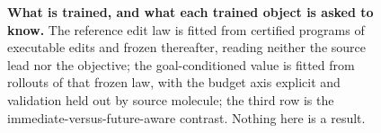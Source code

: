 \begin{figure}[h]
\centering
{}
\caption{\small\textbf{What is trained, and what each trained object is asked to know.} The reference edit law is fitted from certified programs of executable edits and frozen thereafter, reading neither the source lead nor the objective; the goal-conditioned value is fitted from rollouts of that frozen law, with the budget axis explicit and validation held out by source molecule; the third row is the immediate-versus-future-aware contrast. Nothing here is a result.}
\label{fig:trained}
\end{figure}
